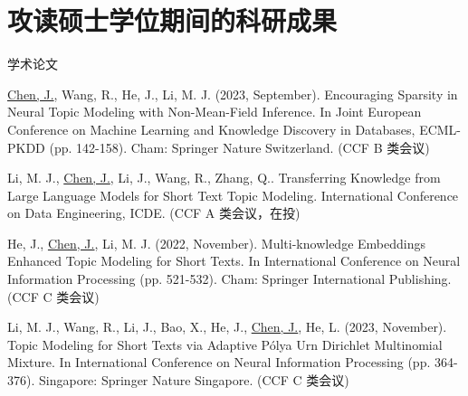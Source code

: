 \chapter{攻读硕士学位期间的科研成果}


\begin{enumerate}[label = {[\arabic*]}]
    \item[] {\heiti 学术论文}
    \item \underline{Chen, J.}, Wang, R., He, J., Li, M. J. (2023, September). Encouraging Sparsity in Neural Topic Modeling with Non-Mean-Field Inference. In Joint European Conference on Machine Learning and Knowledge Discovery in Databases, ECML-PKDD (pp. 142-158). Cham: Springer Nature Switzerland. (CCF B 类会议)
    \item Li, M. J., \underline{Chen, J.}, Li, J., Wang, R., Zhang, Q.. Transferring Knowledge from Large Language Models for Short Text Topic Modeling. International Conference on Data Engineering, ICDE. (CCF A 类会议，在投)
    \item He, J., \underline{Chen, J.}, Li, M. J. (2022, November). Multi-knowledge Embeddings Enhanced Topic Modeling for Short Texts. In International Conference on Neural Information Processing (pp. 521-532). Cham: Springer International Publishing. (CCF C 类会议)
    \item Li, M. J., Wang, R., Li, J., Bao, X., He, J., \underline{Chen, J.}, He, L. (2023, November). Topic Modeling for Short Texts via Adaptive P{\'{o}}lya Urn Dirichlet Multinomial Mixture. In International Conference on Neural Information Processing (pp. 364-376). Singapore: Springer Nature Singapore. (CCF C 类会议)
\end{enumerate}
